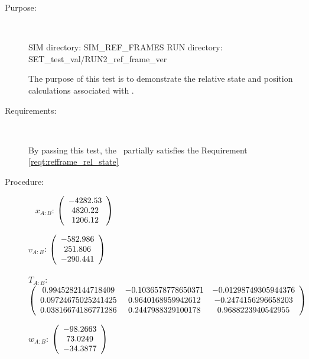 \label{test:refframe_test_5}
\begin{description}
\item[Purpose:] \ \newline

SIM directory: SIM\_REF\_FRAMES
RUN directory: SET\_test\_val/RUN2\_ref\_frame\_ver

The purpose of this test is to demonstrate the relative state and
position calculations associated with .

\item[Requirements:] \ \newline

By passing this test, the \ partially satisfies
the Requirement \ref{reqt:refframe_rel_state}

\item[Procedure:] \ \newline
$x_{A:B}$:  $\left( \begin{array} {ccc}  -4282.53 \\    4820.22 \\    1206.12
\end{array} \right)\\ \\$

$v_{A:B}$:   $\left( \begin{array} {ccc}  -582.986 \\    251.806 \\   -290.441
\end{array} \right)\\ \\$

$T_{A:B}$:   $\left( \begin{array} {ccc}
0.9945282144718409 & -0.1036578778650371 & -0.01298749305944376 \\
0.09724675025241425 & 0.9640168959942612 & -0.2474156296658203 \\
0.03816674186771286 & 0.2447988329100178 & 0.9688223940542955
\end{array} \right)\\ \\$

$w_{A:B}$:   $\left( \begin{array} {ccc}  -98.2663 \\    73.0249 \\   -34.3877
\end{array} \right)\\ \\$


\end{description}
